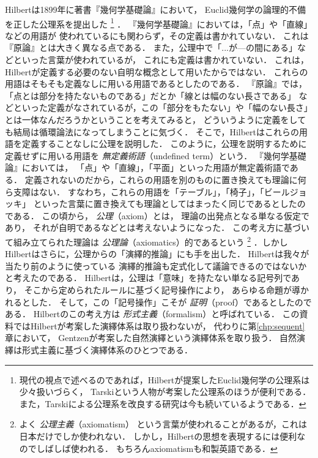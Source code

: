   Hilbertは1899年に著書『幾何学基礎論』において，
  Euclid幾何学の論理的不備を正した公理系を提出した
  \footnote{現代の視点で述べるのであれば，Hilbertが提案したEuclid幾何学の公理系は
  少々扱いづらく，
  Tarskiという人物が考案した公理系のほうが便利である．
  また，Tarskiによる公理系を改良する研究は今も続いているようである．}
  ．
  『幾何学基礎論』においては，「点」や「直線」などの用語が
  使われているにも関わらず，その定義は書かれていない．
  これは『原論』とは大きく異なる点である．
  また，公理中で「...が---の間にある」などといった言葉が使われているが，
  これにも定義は書かれていない．
  これは，Hilbertが定義する必要のない自明な概念として用いたからではない．
  これらの用語はそもそも定義なしに用いる用語であるとしたのである．
  『原論』では，「点とは部分を持たないものである」だとか「線とは幅のない長さである」
  などといった定義がなされているが，この「部分をもたない」や「幅のない長さ」
  とは一体なんだろうかということを考えてみると，
  どういうように定義をしても結局は循環論法になってしまうことに気づく．
  そこで，Hilbertはこれらの用語を定義することなしに公理を説明した．
  このように，公理を説明するために定義せずに用いる用語を
  \emph{無定義術語}（undefined term）という．
  『幾何学基礎論』においては，
  「点」や「直線」，「平面」といった用語が無定義術語である．
  定義されないのだから，これらの用語を別のものに置き換えても理論に何ら支障はない．
  すなわち，これらの用語を「テーブル」，「椅子」，「ビールジョッキ」
  といった言葉に置き換えても理論としてはまったく同じであるとしたのである．
  この頃から，
  \emph{公理}（axiom）とは，
  理論の出発点となる単なる仮定であり，
  それが自明であるなどとは考えないようになった．
  この考え方に基づいて組み立てられた理論は
  \emph{公理論}（axiomatics）的であるという
  \footnote{よく
    \emph{公理主義}（axiomatism）
    という言葉が使われることがあるが，これは日本だけでしか使われない．
    しかし，Hilbertの思想を表現するには便利なのでしばしば使われる．
    もちろんaxiomatismも和製英語である．}
  ．しかしHilbertはさらに，公理からの「演繹的推論」にも手を出した．
  Hilbertは我々が当たり前のように使っている
  演繹的推論も定式化して議論できるのではないかと考えたのである．
  Hilbertは，公理は「意味」を持たない単なる記号列であり，
  そこから定められたルールに基づく記号操作により，
  あらゆる命題が導かれるとした．
  そして，この「記号操作」こそが
  \emph{証明}（proof）であるとしたのである．
  Hilbertのこの考え方は
  \emph{形式主義}（formalism）と呼ばれている．
  この資料ではHilbertが考案した演繹体系は取り扱わないが，
  代わりに第\ref{chp:sequent}章において，
  Gentzenが考案した自然演繹という演繹体系を取り扱う．
  自然演繹は形式主義に基づく演繹体系のひとつである．

